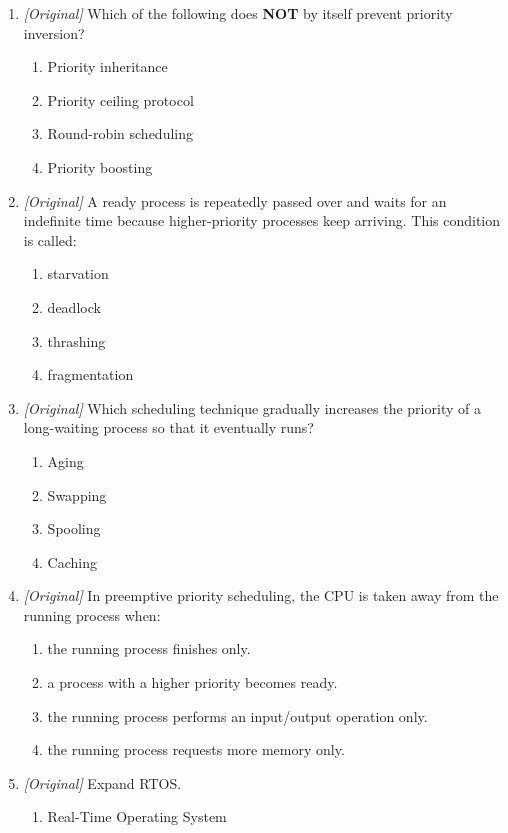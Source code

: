 \begin{enumerate}[label=\textbf{Q\arabic*.}, leftmargin=*]
\item \textit{[Original]} Which of the following does \textbf{NOT} by itself
  prevent priority inversion?
  \begin{enumerate}[label=\Alph*.]
    \item Priority inheritance
    \item Priority ceiling protocol
    \item Round-robin scheduling
    \item Priority boosting
  \end{enumerate}
\item \textit{[Original]} A ready process is repeatedly passed over and waits
  for an indefinite time because higher-priority processes keep arriving.
  This condition is called:
  \begin{enumerate}[label=\Alph*.]
    \item starvation
    \item deadlock
    \item thrashing
    \item fragmentation
  \end{enumerate}
\item \textit{[Original]} Which scheduling technique gradually increases the
  priority of a long-waiting process so that it eventually runs?
  \begin{enumerate}[label=\Alph*.]
    \item Aging
    \item Swapping
    \item Spooling
    \item Caching
  \end{enumerate}
\item \textit{[Original]} In preemptive priority scheduling, the CPU is taken
  away from the running process when:
  \begin{enumerate}[label=\Alph*.]
    \item the running process finishes only.
    \item a process with a higher priority becomes ready.
    \item the running process performs an input/output operation only.
    \item the running process requests more memory only.
  \end{enumerate}
\item \textit{[Original]} Expand RTOS.
  \begin{enumerate}[label=\Alph*.]
    \item Real-Time Operating System

\end{enumerate}
\end{enumerate}
